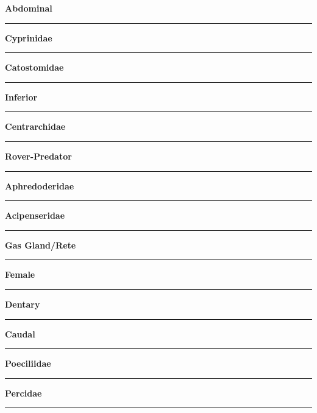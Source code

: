 \documentclass[11pt]{exam}
\newcommand*\Matching[1]{
\ifprintanswers
	\textbf{#1}
\else
	\rule{2.1in}{0.4pt}
\fi
}
\newlength\matchlena
\newlength\matchlenb
\newcommand\MatchQuestion[2]{%
	\setlength\matchlenb{\linewidth}
	\addtolength\matchlenb{-\matchlena}
	\parbox[t]{\matchlena}{\Matching{#1}}\enspace\parbox[t]{\matchlenb}{#2}}
\begin{document}
\begin{questions}
\begin{multicols}{2}
\question\MatchQuestion{Abdominal}{}
\vspace{2\baselineskip}

\question\MatchQuestion{Cyprinidae}{}
\vspace{2\baselineskip}

\question\MatchQuestion{Catostomidae}{}
\vspace{2\baselineskip}

\question\MatchQuestion{Inferior}{}
\vspace{2\baselineskip}

\question\MatchQuestion{Centrarchidae}{}
\vspace{2\baselineskip}

\question\MatchQuestion{Rover-Predator}{}
\vspace{2\baselineskip}

\question\MatchQuestion{Aphredoderidae}{}
\vspace{2\baselineskip}

\question\MatchQuestion{Acipenseridae}{}
\vspace{2\baselineskip}


\question\MatchQuestion{Gas Gland/Rete}{}
\vspace{2\baselineskip}

\question\MatchQuestion{Female}{}
\vspace{2\baselineskip}

\question\MatchQuestion{Dentary}{}
\vspace{2\baselineskip}


\question\MatchQuestion{Caudal}{}
\vspace{2\baselineskip}

%
%
\question\MatchQuestion{Poeciliidae}{}
\vspace{2\baselineskip}

\question\MatchQuestion{Percidae}{}
\vspace{2\baselineskip}



\end{multicols}
\end{questions}
\end{document}
